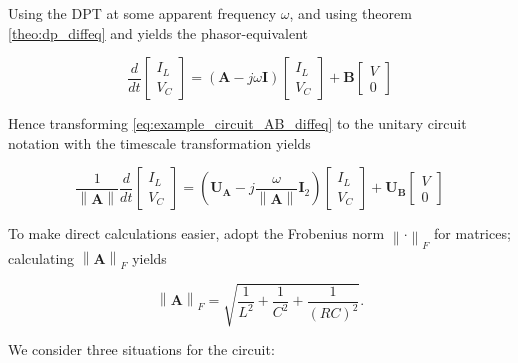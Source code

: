 \begin{example}
	Using the DPT at some apparent frequency $\omega$, and using theorem \ref{theo:dp_diffeq} and yields the phasor-equivalent

\begin{equation} \dfrac{d}{dt}\left[\begin{array}{c} I_L \\ V_C \end{array}\right] = \left(\mathbf{A} - j\omega \mathbf{I} \right) \left[\begin{array}{c} I_L \\ V_C \end{array}\right] +  \mathbf{B}\left[\begin{array}{c} V \\ 0 \end{array}\right] \label{eq:example_circuit_AB_diffeq} \end{equation}

	Hence transforming \eqref{eq:example_circuit_AB_diffeq} to the unitary circuit notation with the timescale transformation yields

\small\begin{equation} \dfrac{1}{\left\lVert \mathbf{A}\right\rVert} \dfrac{d}{dt}\left[\begin{array}{c} I_L \\ V_C \end{array}\right] = \left(\mathbf{U_A} - j\dfrac{\omega}{\left\lVert \mathbf{A}\right\rVert}\mathbf{I}_2\right) \left[\begin{array}{c} I_L \\ V_C \end{array}\right] + \mathbf{U_B} \left[\begin{array}{c} V \\ 0 \end{array}\right] \end{equation}\normalsize

	To make direct calculations easier, adopt the Frobenius norm $\left\lVert \cdot\right\rVert_F$ for matrices; calculating $\left\lVert \mathbf{A}\right\rVert_F$ yields

\begin{equation} \left\lVert \mathbf{A}\right\rVert_F = \sqrt{\dfrac{1}{L^2} + \dfrac{1}{C^2} + \dfrac{1}{\left(RC\right)^2}}.\end{equation}

	We consider three situations for the circuit:


\end{example}
